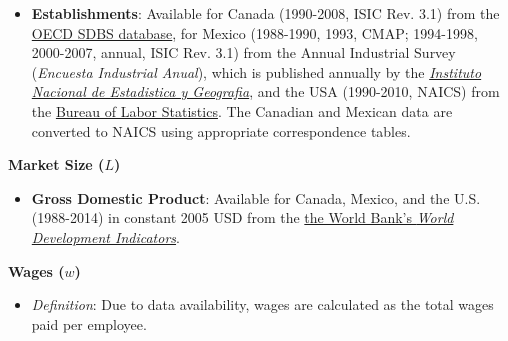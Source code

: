 \begin{spacing}{1}
\begin{itemize}

	\item \textbf{Establishments}: Available for Canada (1990-2008, ISIC Rev. 3.1) from the \href{http://stats.oecd.org/index.aspx?queryid=224}{OECD SDBS database}, for Mexico (1988-1990, 1993, CMAP; 1994-1998, 2000-2007, annual, ISIC Rev. 3.1) from the Annual Industrial Survey (\emph{Encuesta Industrial Anual}), which is published annually by   the \href{http://buscador.inegi.org.mx/search?q=encuesta+industrial+anual&client=ProductosR&proxystylesheet=ProductosR&num=10&getfields=*&sort=meta:edicion:D:E:::D&entsp=a__inegi_politica_p72&lr=lang_es\%7Clang_en&oe=UTF-8&ie=UTF-8&ip=10.210.100.253&entqr=3&filter=0&site=ProductosBuscador&tlen=260&ulang=en&start=0}{\emph{Instituto Nacional de Estadistica y Geografia}}, and the USA (1990-2010, NAICS) from the \href{http://www.bls.gov/cew/doc/titles/ownership/ownership_titles.htm}{Bureau of Labor Statistics}. The Canadian and Mexican data are converted to NAICS using appropriate correspondence tables. 
		
	\end{itemize}	


\noindent \textbf{Market Size ($L$)}
	\begin{itemize}
	
	\item \textbf{Gross Domestic Product}: Available for Canada, Mexico, and the U.S. (1988-2014) in constant 2005 USD from the \href{http://data.worldbank.org/data-catalog/world-development-indicators}{the World Bank's \emph{World Development Indicators}}.
		
	\end{itemize}	
	
\noindent \textbf{Wages ($w$)}
	\begin{itemize}
	
	\item \emph{Definition}: Due to data availability, wages are calculated as the total wages paid per employee.


\end{itemize}
\end{spacing}

